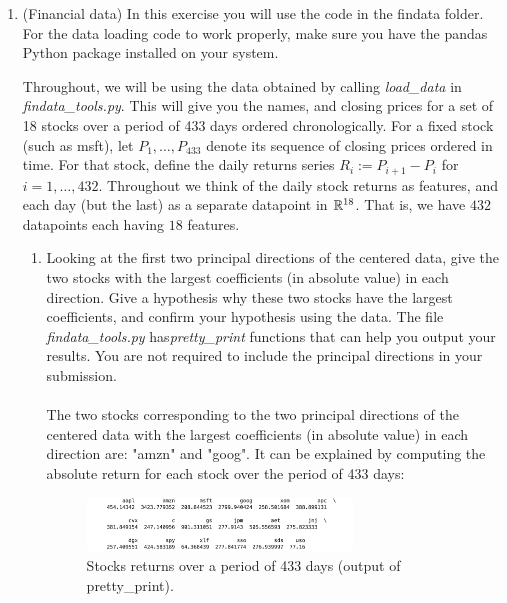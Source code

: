 \documentclass[12pt,twoside]{article}
\begin{document}
\begin{enumerate}
 \newpage
  
 \item (Financial data) In this exercise you will use the code in the findata folder.
  For the data loading code to work properly, make sure you
  have the pandas Python package installed on your system.

  Throughout, we will be using the data obtained by calling
 \emph{load\_data} in \emph{findata\_tools.py}.  This will
  give you the names, and closing prices for a set of 18 stocks over a
  period of 433 days ordered chronologically.
  For a fixed stock (such as msft), let
  $P_1,\ldots,P_{433}$ denote its sequence of closing prices ordered in
  time.  For that stock, define the daily returns series $R_i:=P_{i+1}-P_i$ for
  $i=1,\ldots,432$.  Throughout we think of the daily stock returns as features,
  and each day (but the last) as a separate datapoint in $\mathbb{R}^{18}$.
  That is, we have $432$ datapoints each having $18$ features.
  \begin{enumerate}
  \item Looking at the first two principal directions of the
    centered data, give the two stocks with the largest
    coefficients (in absolute value) in each direction.  
    Give a hypothesis why these two stocks have the largest
    coefficients, and confirm your hypothesis using the data.  The file 
   \emph{findata\_tools.py} has\emph{pretty\_print}
    functions that can help you output your results.
    You are not required to include the principal directions in
    your submission.\\ \\
    The two stocks corresponding to the two principal directions of the centered data with the largest coefficients (in absolute value) in each direction
    are: "amzn" and  "goog". It can be explained by computing the absolute return for each stock over the period of 433 days:

	\begin{figure}[H]
		\centering
		\includegraphics[width=200pt]{figures/pb_3_a.png}
		\caption{Stocks returns over a period of 433 days (output of pretty\_print).}
		\label{fig1}
	\end{figure}
    

\end{enumerate}
\end{enumerate}
\end{document}
